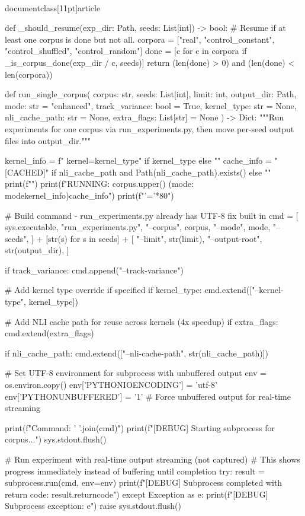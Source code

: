 \\documentclass[11pt]{article}
\begin{document}
\begin{CodeBlock}
def _should_resume(exp_dir: Path, seeds: List[int]) -> bool:
    # Resume if at least one corpus is done but not all.
    corpora = ["real", "control_constant", "control_shuffled", "control_random"]
    done = [c for c in corpora if _is_corpus_done(exp_dir / c, seeds)]
    return (len(done) > 0) and (len(done) < len(corpora))



def run_single_corpus(
    corpus: str,
    seeds: List[int],
    limit: int,
    output_dir: Path,
    mode: str = "enhanced",
    track_variance: bool = True,
    kernel_type: str = None,
    nli_cache_path: str = None,
    extra_flags: List[str] = None
) -> Dict:
    """Run experiments for one corpus via run_experiments.py, then move per-seed output files into output_dir."""

    kernel_info = f" kernel={kernel_type}" if kernel_type else ""
    cache_info = " [CACHED]" if nli_cache_path and Path(nli_cache_path).exists() else ""
    print(f"")
    print(f"RUNNING: {corpus.upper()} (mode: {mode}{kernel_info}){cache_info}")
    print(f"{'='*80}")

    # Build command - run_experiments.py already has UTF-8 fix built in
    cmd = [
        sys.executable,
        "run_experiments.py",
        "--corpus", corpus,
        "--mode", mode,
        "--seeds",
    ] + [str(s) for s in seeds] + [
        "--limit", str(limit),
        "--output-root", str(output_dir),
    ]

    if track_variance:
        cmd.append("--track-variance")
    
    # Add kernel type override if specified
    if kernel_type:
        cmd.extend(["--kernel-type", kernel_type])
    
    # Add NLI cache path for reuse across kernels (4x speedup)
    if extra_flags:
        cmd.extend(extra_flags)

    if nli_cache_path:
        cmd.extend(["--nli-cache-path", str(nli_cache_path)])
    
    # Set UTF-8 environment for subprocess with unbuffered output
    env = os.environ.copy()
    env['PYTHONIOENCODING'] = 'utf-8'
    env['PYTHONUNBUFFERED'] = '1'  # Force unbuffered output for real-time streaming

    print(f"Command: {' '.join(cmd)}")
    print(f"[DEBUG] Starting subprocess for {corpus}...")
    sys.stdout.flush()

    # Run experiment with real-time output streaming (not captured)
    # This shows progress immediately instead of buffering until completion
    try:
        result = subprocess.run(cmd, env=env)
        print(f"[DEBUG] Subprocess completed with return code: {result.returncode}")
    except Exception as e:
        print(f"[DEBUG] Subprocess exception: {e}")
        raise
    sys.stdout.flush()


\end{CodeBlock}
\end{document}
